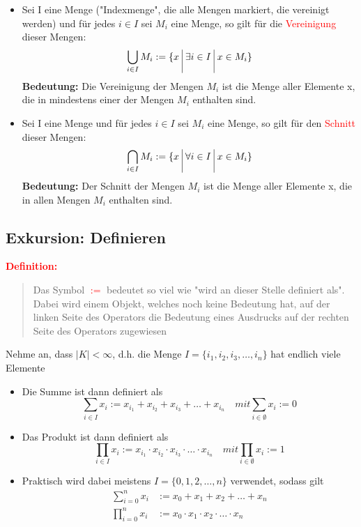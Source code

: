 \documentclass{article}
\newcommand{\smsp}{\phantom{\hspace{3px}}}
\newcommand{\red}[1]{\textcolor{red}{#1}}
\newcommand{\de}[1]{\red{\textbf{Definition: }}\begin{quote}#1\end{quote}}
\newcommand{\vst}{\smsp \vline \smsp}
\begin{document}
\begin{itemize}
    \item Sei I eine Menge ("Indexmenge", die alle Mengen markiert, die vereinigt werden) und für jedes $i \in I$ sei $M_i$ eine Menge, so gilt für die \textcolor{red}{Vereinigung} dieser Mengen:
    \begin{equation*}
        \bigcup_{i \in I} M_i := \{x \vst \exists i \in I \vst x \in M_i\}
    \end{equation*}
    \textbf{Bedeutung:} Die Vereinigung der Mengen $M_i$ ist die Menge aller Elemente x, die in mindestens einer der Mengen $M_i$ enthalten sind.
    \item Sei I eine Menge und für jedes $i \in I$ sei $M_i$ eine Menge, so gilt für den \textcolor{red}{Schnitt} dieser Mengen:
    \begin{equation*}
        \bigcap_{i \in I} M_i := \{x \vst \forall i \in I \vst x \in M_i\}
    \end{equation*}
    \textbf{Bedeutung:} Der Schnitt der Mengen $M_i$ ist die Menge aller Elemente x, die in allen Mengen $M_i$ enthalten sind.
\end{itemize}

\subsection*{Exkursion: Definieren}

\de{Das Symbol \red{$:=$} bedeutet so viel wie "wird an dieser Stelle definiert als". Dabei wird einem Objekt, welches noch keine Bedeutung hat, auf der linken Seite des Operators die Bedeutung eines Ausdrucks auf der rechten Seite des Operators zugewiesen}

Nehme an, dass $|K| < \infty$, d.h. die Menge $I = \{i_1, i_2, i_3, \dots, i_n\}$ hat endlich viele Elemente
\begin{itemize}
    \item Die Summe ist dann definiert als
    \begin{equation*}
        \sum_{i \in I} x_i := x_{i_1} + x_{i_2} + x_{i_3} + \dots + x_{i_n} \quad mit \sum_{i \in \emptyset} x_i := 0
    \end{equation*}
    \item Das Produkt ist dann definiert als
    \begin{equation*}
        \prod_{i \in I} x_i := x_{i_1} \cdot x_{i_2} \cdot x_{i_3} \cdot \dots \cdot x_{i_n} \quad mit \prod_{i \in \emptyset} x_i := 1
    \end{equation*}
    \item Praktisch wird dabei meistens $I = \{0, 1 , 2, \dots, n\}$ verwendet, sodass gilt
    \begin{equation*}
        \begin{split}
            \sum_{i = 0}^n x_i & := x_0 + x_1 + x_2 + \dots + x_n\\
            \prod_{i = 0}^n x_i & := x_0 \cdot x_1 \cdot x_2 \cdot \dots \cdot x_n
        \end{split}
    \end{equation*}
\end{itemize}
\end{document}

